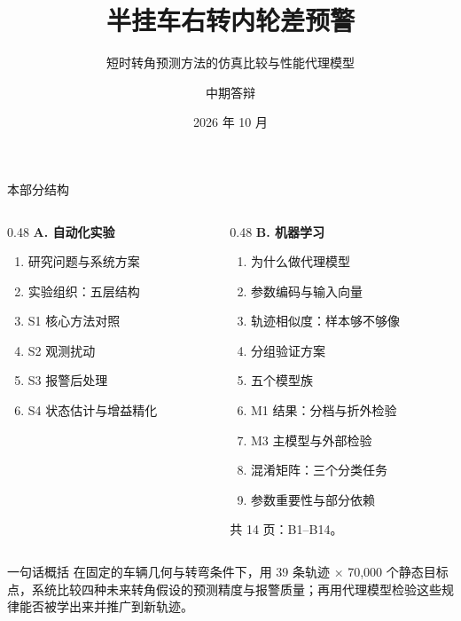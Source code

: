 \documentclass[aspectratio=169,10pt]{ctexbeamer}
\title{半挂车右转内轮差预警}
\subtitle{短时转角预测方法的仿真比较与性能代理模型}
\author{中期答辩}
\date{2026 年 10 月}
\begin{document}
\begin{frame}[plain]
  \titlepage
\end{frame}

\begin{frame}{本部分结构}
  \begin{columns}[T]
    \begin{column}{0.48\textwidth}
      \textbf{\color{blue!55!black}A. 自动化实验}
      \begin{enumerate}\small
        \item 研究问题与系统方案
        \item 实验组织：五层结构
        \item S1 核心方法对照
        \item S2 观测扰动
        \item S3 报警后处理
        \item S4 状态估计与增益精化
      \end{enumerate}
    \end{column}
    \begin{column}{0.48\textwidth}
      \textbf{\color{blue!55!black}B. 机器学习}
      \begin{enumerate}\small
        \item 为什么做代理模型
        \item 参数编码与输入向量
        \item 轨迹相似度：样本够不够像
        \item 分组验证方案
        \item 五个模型族
        \item M1 结果：分档与折外检验
        \item M3 主模型与外部检验
        \item 混淆矩阵：三个分类任务
        \item 参数重要性与部分依赖
      \end{enumerate}
      \vspace{0.3em}
      {\scriptsize\color{black!62}共 14 页：B1--B14。}
    \end{column}
  \end{columns}
  \vspace{0.6em}
  \begin{block}{一句话概括}
    \small 在固定的车辆几何与转弯条件下，用 39 条轨迹 × 70{,}000 个静态目标点，系统比较四种未来转角假设的预测精度与报警质量；再用代理模型检验这些规律能否被学出来并推广到新轨迹。
  \end{block}
\end{frame}
\end{document}
